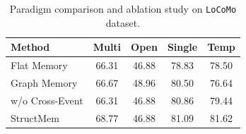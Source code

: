 \begin{table}[!htbp]
\centering
\small 
\begin{tabular}{l|cccc}
\toprule
\textbf{Method} & \textbf{Multi} & \textbf{Open} & \textbf{Single} & \textbf{Temp}\\
\midrule
Flat Memory & 66.31 & 46.88 & 78.83 & 78.50 \\
Graph Memory & 66.67 & 48.96 & 80.50 & 76.64 \\  
\midrule
w/o Cross-Event & 66.31 & 46.88 & 80.86 & 79.44 \\
StructMem & 68.77 & 46.88 & 81.09 & 81.62 \\
\bottomrule
\end{tabular}
\caption{Paradigm comparison and ablation study on \texttt{LoCoMo} dataset.}
\label{tab:ablation}
\end{table}